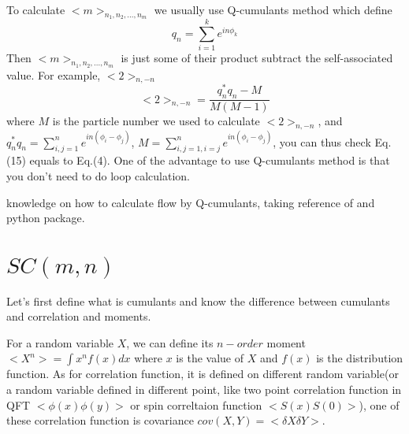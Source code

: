 \documentclass{article}
\begin{document}
\quad To calculate $<m>_{n_1,n_2,...,n_m}$ we usually use Q-cumulants method which define
\begin{equation}
q_n = \sum_{i=1}^{k} e^{in\phi_k}
\end{equation}
Then $<m>_{n_1,n_2,...,n_m}$ is just some of their product subtract the self-associated value. For example, $<2>_{n,-n}$
\begin{equation}
<2>_{n,-n} = \frac{q_n^{*}q_n-M}{M(M-1)}
\end{equation}
where $M$ is the particle number we used to calculate $<2>_{n,-n}$, and  $q_n^{*}q_n = \sum_{i,j=1}^{n} e^{in(\phi_i-\phi_j)}$, $M = \sum_{i,j=1,i=j}^{n} e^{in(\phi_i-\phi_j)}$, you can thus check Eq.(15) equals to Eq.(4). One of the advantage to use Q-cumulants method is that you don't need to do loop calculation.

\quadMore knowledge on how to calculate flow by Q-cumulants, taking reference of \cite{bilandzic2011flow}\cite{bilandzic2012anisotropic} and python package\cite{Duckhic}\cite{myhic}.


\section{$SC(m,n)$}
\quad Let's first define what is cumulants and know the difference between cumulants and correlation and moments.

\quad For a random variable $X$, we can define its $n-order$ moment $<X^{n}> = \int x^{n} f(x) dx$ where $x$ is the value of $X$ and $f(x)$ is the distribution function. As for correlation function, it is defined on different random variable(or a random variable defined in different point, like two point correlation function in QFT $<\phi(x)\phi(y)>$ or spin correltaion function $<S(x)S(0)>$), one of these correlation function is covariance $cov(X,Y)=<\delta{X} \delta{Y}>$.
\end{document}

